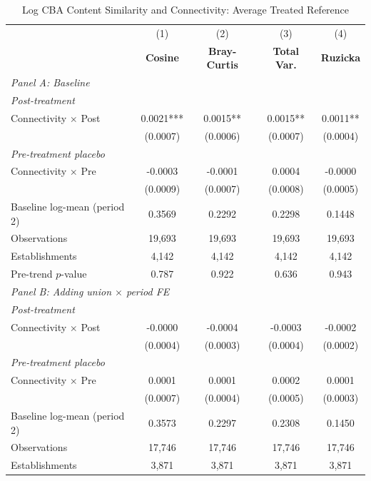 \begin{table}[H]
\centering
\caption{Log CBA Content Similarity and Connectivity: Average Treated Reference}
\scriptsize
\setlength{\tabcolsep}{8pt}
\begin{tabular}{lcccc}
\hline\hline
 & (1) & (2) & (3) & (4) \\
 & \textbf{Cosine} & \textbf{Bray-Curtis} & \textbf{Total Var.} & \textbf{Ruzicka} \\
\hline
\multicolumn{5}{l}{\textit{Panel A: Baseline}} \\
\multicolumn{5}{l}{\textit{Post-treatment}} \\
Connectivity $\times$ Post & 0.0021*** & 0.0015** & 0.0015** & 0.0011** \\
 & (0.0007) & (0.0006) & (0.0007) & (0.0004) \\
\multicolumn{5}{l}{\textit{Pre-treatment placebo}} \\
Connectivity $\times$ Pre & -0.0003 & -0.0001 & 0.0004 & -0.0000 \\
 & (0.0009) & (0.0007) & (0.0008) & (0.0005) \\
\hline
Baseline log-mean (period 2) & 0.3569 & 0.2292 & 0.2298 & 0.1448 \\
Observations &       19,693 &       19,693 &       19,693 &       19,693 \\
Establishments &        4,142 &        4,142 &        4,142 &        4,142 \\
Pre-trend $p$-value & 0.787 & 0.922 & 0.636 & 0.943 \\
\hline
\multicolumn{5}{l}{\textit{Panel B: Adding union $\times$ period FE}} \\
\multicolumn{5}{l}{\textit{Post-treatment}} \\
Connectivity $\times$ Post & -0.0000 & -0.0004 & -0.0003 & -0.0002 \\
 & (0.0004) & (0.0003) & (0.0004) & (0.0002) \\
\multicolumn{5}{l}{\textit{Pre-treatment placebo}} \\
Connectivity $\times$ Pre & 0.0001 & 0.0001 & 0.0002 & 0.0001 \\
 & (0.0007) & (0.0004) & (0.0005) & (0.0003) \\
\hline
Baseline log-mean (period 2) & 0.3573 & 0.2297 & 0.2308 & 0.1450 \\
Observations &       17,746 &       17,746 &       17,746 &       17,746 \\
Establishments &        3,871 &        3,871 &        3,871 &        3,871 \\

\end{tabular}
\end{table}

